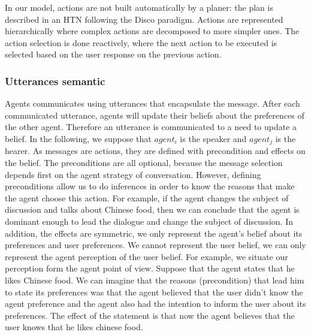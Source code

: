 \documentclass{llncs}
\begin{document}
\begin{itemize}
	In our model, actions are not built automatically by a planer: the plan is described in an HTN following the Disco \cite{rich2009building} paradigm. Actions are represented hierarchically where complex actions are decomposed to more simpler ones. The action selection is done reactively, where the next action to be executed is selected based on the user response on the previous action. 
	
	
\end{itemize}


\subsubsection{Utterances semantic}
Agents communicates using utterances that encapsulate the message. After each communicated utterance, agents will update their beliefs about the preferences of the other agent. Therefore an utterance is communicated to a need to update a belief. In the following, we suppose that $agent_{i}$ is the speaker and $agent_{j}$ is the hearer. As messages are actions, they are defined with precondition and effects on the belief. The preconditions are all optional, because the message selection depends first on the agent strategy of conversation. However, defining preconditions allow us to do inferences in order to know the reasons that make the agent choose this action. For example, if the agent changes the subject of discussion and talks about Chinese food, then we can conclude that the agent is dominant enough to lead the dialogue and change the subject of discussion. In addition, the effects are symmetric, we only represent the  agent's belief about its preferences and user preferences. We cannot represent the user belief, we can only represent the agent perception of the user belief. For example, we situate our perception form the agent point of view. Suppose that the agent states that he likes Chinese food.  We can imagine that the reasons (precondition) that lead him  to state its preferences was that the agent believed that the user didn't know the agent preference and the agent also had the intention to inform the user about its preferences. The effect of the statement is that now the agent believes that the user knows that he likes chinese food. 
\end{document}
